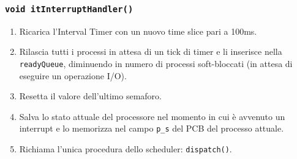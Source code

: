 \documentclass[a4paper,12pt]{article}
\begin{document}
\subsubsection{\texttt{void itInterruptHandler()}}
\begin{enumerate}
    \item Ricarica l'Interval Timer con un nuovo time slice pari a 100ms.
    \item Rilascia tutti i processi in attesa di un tick di timer e li inserisce nella \texttt{readyQueue}, diminuendo in numero di processi soft-bloccati (in attesa di eseguire un operazione I/O).
    \item Resetta il valore dell'ultimo semaforo.
    \item Salva lo stato attuale del processore nel momento in cui è avvenuto un interrupt e lo memorizza nel campo \texttt{p\_s} del PCB del processo attuale.
    \item Richiama l'unica procedura dello scheduler: \texttt{dispatch()}. 
\end{enumerate}
\end{document}

